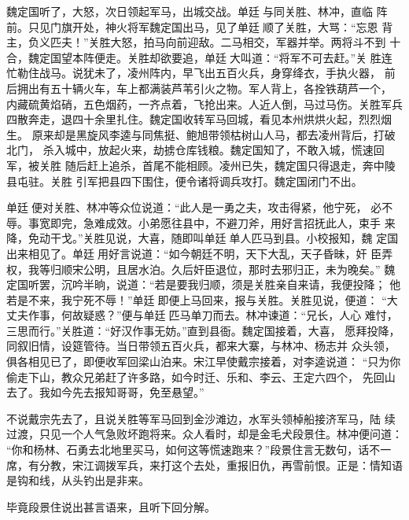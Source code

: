 魏定国听了，大怒，次日领起军马，出城交战。单廷与同关胜、林冲，直临
阵前。只见门旗开处，神火将军魏定国出马，见了单廷顺了关胜，大骂：“忘恩
背主，负义匹夫！”关胜大怒，拍马向前迎敌。二马相交，军器并举。两将斗不到
十合，魏定国望本阵便走。关胜却欲要追，单廷大叫道：“将军不可去赶。”关
胜连忙勒住战马。说犹未了，凌州阵内，早飞出五百火兵，身穿绛衣，手执火器，
前后拥出有五十辆火车，车上都满装芦苇引火之物。军人背上，各拴铁葫芦一个，
内藏硫黄焰硝，五色烟药，一齐点着，飞抢出来。人近人倒，马过马伤。关胜军兵
四散奔走，退四十余里扎住。魏定国收转军马回城，看见本州烘烘火起，烈烈烟生。
原来却是黑旋风李逵与同焦挺、鲍旭带领枯树山人马，都去凌州背后，打破北门，
杀入城中，放起火来，劫掳仓库钱粮。魏定国知了，不敢入城，慌速回军，被关胜
随后赶上追杀，首尾不能相顾。凌州已失，魏定国只得退走，奔中陵县屯驻。关胜
引军把县四下围住，便令诸将调兵攻打。魏定国闭门不出。

单廷便对关胜、林冲等众位说道：“此人是一勇之夫，攻击得紧，他宁死，
必不辱。事宽即完，急难成效。小弟愿往县中，不避刀斧，用好言招抚此人，束手
来降，免动干戈。”关胜见说，大喜，随即叫单廷单人匹马到县。小校报知，魏
定国出来相见了。单廷用好言说道：“如今朝廷不明，天下大乱，天子昏昧，奸
臣弄权，我等归顺宋公明，且居水泊。久后奸臣退位，那时去邪归正，未为晚矣。”
魏定国听罢，沉吟半晌，说道：“若是要我归顺，须是关胜亲自来请，我便投降；
他若是不来，我宁死不辱！”单廷即便上马回来，报与关胜。关胜见说，便道：
“大丈夫作事，何故疑惑？”便与单廷匹马单刀而去。林冲谏道：“兄长，人心
难忖，三思而行。”关胜道：“好汉作事无妨。”直到县衙。魏定国接着，大喜，
愿拜投降，同叙旧情，设筵管待。当日带领五百火兵，都来大寨，与林冲、杨志并
众头领，俱各相见已了，即便收军回梁山泊来。宋江早使戴宗接着，对李逵说道：
“只为你偷走下山，教众兄弟赶了许多路，如今时迁、乐和、李云、王定六四个，
先回山去了。我如今先去报知哥哥，免至悬望。”

不说戴宗先去了，且说关胜等军马回到金沙滩边，水军头领棹船接济军马，陆
续过渡，只见一个人气急败坏跑将来。众人看时，却是金毛犬段景住。林冲便问道：
“你和杨林、石勇去北地里买马，如何这等慌速跑来？”段景住言无数句，话不一
席，有分教，宋江调拨军兵，来打这个去处，重报旧仇，再雪前恨。正是：情知语
是钩和线，从头钓出是非来。

毕竟段景住说出甚言语来，且听下回分解。